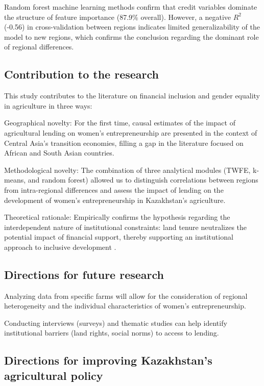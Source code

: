﻿\documentclass[pdflatex,sn-mathphys-ay]{sn-jnl}
\begin{document}
Random forest machine learning methods confirm that credit variables
dominate the structure of feature importance (87.9\% overall). However,
a negative $R^2$ (-0.56) in cross-validation between regions indicates
limited generalizability of the model to new regions, which confirms the
conclusion regarding the dominant role of regional differences.

\subsection{Contribution to the research}

This study contributes to the literature on financial inclusion and
gender equality in agriculture in three ways:

Geographical novelty: For the first time, causal estimates of the impact
of agricultural lending on women's entrepreneurship are presented in the
context of Central Asia's transition economies, filling a gap in the
literature focused on African and South Asian countries.

Methodological novelty: The combination of three analytical modules
(TWFE, k-means, and random forest) allowed us to distinguish
correlations between regions from intra-regional differences and assess
the impact of lending on the development of women's entrepreneurship in
Kazakhstan's agriculture.

Theoretical rationale: Empirically confirms the hypothesis regarding the
interdependent nature of institutional constraints: land tenure
neutralizes the potential impact of financial support, thereby
supporting an institutional approach to inclusive development
\citep{ref78,ref90}.

\subsection{Directions for future research}

Analyzing data from specific farms will allow for the consideration of
regional heterogeneity and the individual characteristics of women's
entrepreneurship.

Conducting interviews (surveys) and thematic studies can help identify
institutional barriers (land rights, social norms) to access to lending.

\subsection{Directions for improving Kazakhstan's agricultural policy}
\end{document}
